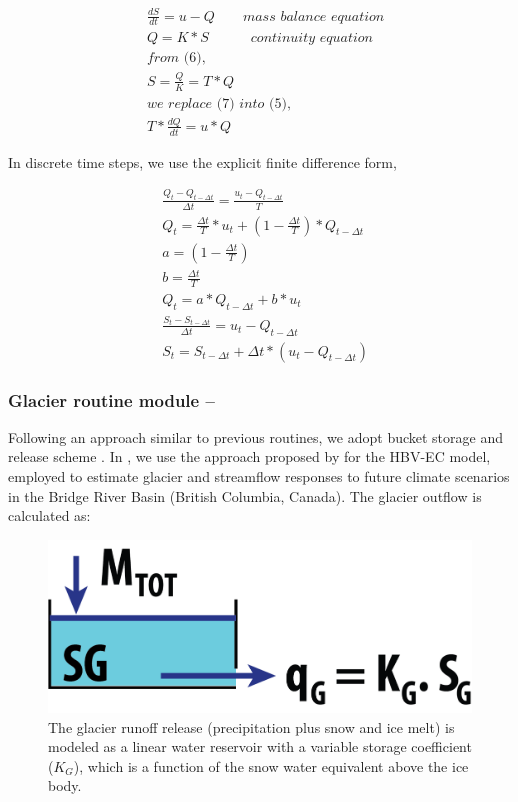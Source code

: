 \begin{align}
& \frac{dS}{dt} = u - Q  \quad \quad \textit{mass balance equation} \\
& Q = K * S \quad \quad \quad \textit{continuity equation} \\ 
& \textit{from (6),} \nonumber \\
& S = \frac{Q}{K} = T * Q \\
& \textit{we replace (7) into (5),} \nonumber \\
& T * \frac{dQ}{dt} = u * Q \nonumber 
\end{align}

\noindent
In discrete time steps, we use the explicit finite difference form,

\begin{align}
& \frac{Q_t - Q_{t-\Delta t}}{\Delta t} = \frac{u_t - Q_{t-\Delta t}}{T} \nonumber \\
& Q_t = \frac{\Delta t}{T} * u_t + (1 - \frac{\Delta t}{T}) * Q_{t-\Delta t} \nonumber \\
& a = (1 - \frac{\Delta t}{T}) \nonumber \\
& b = \frac{\Delta t}{T} \nonumber \\ 
& Q_t = a * Q_{t-\Delta t} + b * u_t  \\
& \frac{S_t - S_{t-\Delta t}}{\Delta t} = u_t - Q_{t-\Delta t} \nonumber \\
& S_t = S_{t-\Delta t} + \Delta t * (u_t - Q_{t-\Delta t})
\end{align}

\subsubsection{Glacier routine module – }

Following an approach similar to previous routines, we adopt bucket storage and release scheme
\citep{jansson:2003}. In , we use the approach proposed by \citet{stahl_hbv:2008} for the HBV-EC model,
employed to estimate glacier and streamflow responses to future climate scenarios in the Bridge River Basin (British Columbia,
Canada). The glacier outflow is calculated as:

\begin{figure}[htbp]
  \centering
  \includegraphics[scale = 0.6]{glacier_discharge_hbv}
  \caption{The glacier runoff release (precipitation plus snow and ice melt) is modeled as a linear water reservoir
  with a variable storage coefficient ($K_G$), which is a function of the snow water equivalent above the ice body.}
  \label{fig:glacier}
\end{figure}

